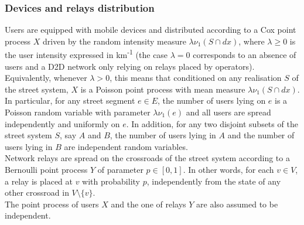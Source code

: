 \documentclass[conference]{IEEEtran}
\begin{document}
\subsubsection{Devices and relays distribution}
\indent Users are equipped with mobile devices and distributed according to a Cox point process $X$ driven by the random intensity measure $\lambda \nu_{1}(S \cap dx)$, where $\lambda \geq 0$ is the user intensity expressed in km\textsuperscript{-1} (the case $\lambda = 0$ corresponds to an absence of users and a D2D network only relying on relays placed by operators). Equivalently, whenever $\lambda > 0$, this means that conditioned on any realisation $S$ of the street system, $X$ is a Poisson point process with mean measure $\lambda \nu_{1}(S \cap dx)$. In particular, for any street segment $e \in E$, the number of users lying on $e$ is a Poisson random variable with parameter $\lambda \nu_{1}(e)$ and all users are spread independently and uniformly on $e$. In addition, for any two disjoint subsets of the street system $S$, say $A$ and $B$, the number of users lying in $A$ and the number of users lying in $B$ are independent random variables.\\
\indent Network relays are spread on the crossroads of the street system according to a Bernoulli point process $Y$ of parameter $p \in \left[0,1\right]$. In other words, for each $v \in V$, a relay is placed at $v$ with probability $p$, independently from the state of any other crossroad in $V \setminus \lbrace v\rbrace$. \\
\indent The point process of users $X$ and the one of relays $Y$ are also assumed to be independent. \\
\end{document}
